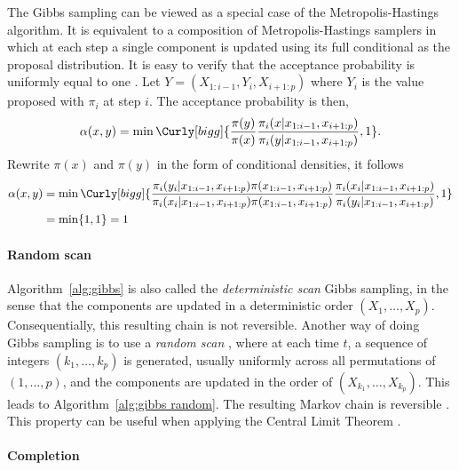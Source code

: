 The Gibbs sampling can be viewed as a special case of the Metropolis-Hastings
algorithm. It is equivalent to a composition of Metropolis-Hastings samplers
in which at each step a single component is updated using its full conditional
as the proposal distribution. It is easy to verify that the acceptance
probability is uniformly equal to one \cite[][Theorem~10.13]{Robert:2004tn}.
Let $Y = (X_{1:i-1},Y_i,X_{i+1:p})$ where $Y_i$ is the value proposed with
$\pi_i$ at step $i$. The acceptance probability is then,
\begin{equation*}
  \alpha(x,y) = \min\Curly[bigg]{
    \frac{\pi(y)}{\pi(x)}
    \frac{\pi_i(x|x_{1:i-1},x_{i+1:p})}{\pi_i(y|x_{1:i-1},x_{i+1:p})},1}.
\end{equation*}
Rewrite $\pi(x)$ and $\pi(y)$ in the form of conditional densities, it follows
\begin{align*}
  \alpha(x,y) &= \min\Curly[bigg]{
    \frac{\pi_i(y_i|x_{1:i-1}, x_{i+1:p})\pi(x_{1:i-1},x_{i+1:p})}
    {\pi_i(x_i|x_{1:i-1}, x_{i+1:p})\pi(x_{1:i-1},x_{i+1:p})}
    \frac{\pi_i(x_i|x_{1:i-1}, x_{i+1:p})}{\pi_i(y_i|x_{1:i-1}, x_{i+1:p})},1}
    \\
  &= \min\{1,1\} = 1
\end{align*}

\paragraph{Random scan}

Algorithm~\ref{alg:gibbs} is also called the \emph{deterministic scan} Gibbs
sampling, in the sense that the components are updated in a deterministic
order $(X_1,\dots,X_p)$. Consequentially, this resulting chain is not
reversible. Another way of doing Gibbs sampling is to use a \emph{random
scan} \cite{Liu1995Gibbs}, where at each time $t$, a sequence of integers
$(k_1,\dots,k_p)$ is generated, usually uniformly across all permutations of
$(1,\dots,p)$, and the components are updated in the order of
$(X_{k_1},\dots,X_{k_p})$. This leads to Algorithm~\ref{alg:gibbs random}.
The resulting Markov chain is reversible \cite{Liu1995Gibbs}. This property
can be useful when applying the Central Limit Theorem
\cite[][sec.~10.1.2]{Robert:2004tn}.



\paragraph{Completion}

